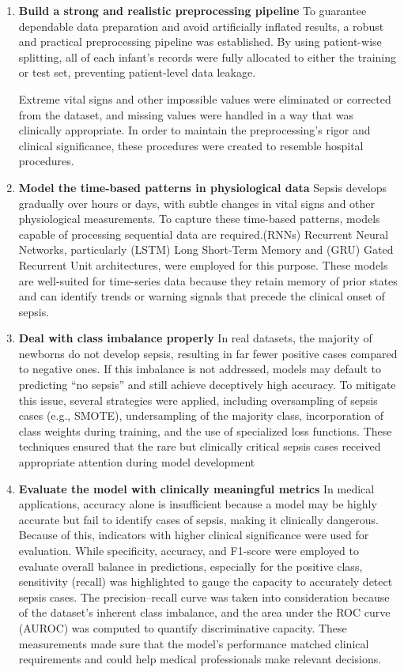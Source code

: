 \documentclass[conference]{IEEEtran}
\begin{document}
\begin{enumerate}
  \item \textbf{Build a strong and realistic preprocessing pipeline} To guarantee dependable data preparation and avoid artificially inflated results, a robust and practical preprocessing pipeline was established. By using patient-wise splitting, all of each infant's records were fully allocated to either the training or test set, preventing patient-level data leakage.

Extreme vital signs and other impossible values were eliminated or corrected from the dataset, and missing values were handled in a way that was clinically appropriate. In order to maintain the preprocessing's rigor and clinical significance, these procedures were created to resemble hospital procedures.

    \item \textbf{Model the time-based patterns in physiological data }Sepsis develops gradually over hours or days, with subtle changes in vital signs and other physiological measurements. To capture these time-based patterns, models capable of processing sequential data are required.(RNNs) Recurrent Neural Networks, particularly (LSTM) Long Short-Term Memory and  (GRU) Gated Recurrent Unit architectures, were employed for this purpose. These models are well-suited for time-series data because they retain memory of prior states and can identify trends or warning signals that precede the clinical onset of sepsis.
    \item \textbf{Deal with class imbalance properly  } In real datasets, the majority of newborns do not develop sepsis, resulting in far fewer positive cases compared to negative ones. If this imbalance is not addressed, models may default to predicting “no sepsis” and still achieve deceptively high accuracy. To mitigate this issue, several strategies were applied, including oversampling of sepsis cases (e.g., SMOTE), undersampling of the majority class, incorporation of class weights during training, and the use of specialized loss functions. These techniques ensured that the rare but clinically critical sepsis cases received appropriate attention during model development
      \item \textbf{Evaluate the model with clinically meaningful metrics  }In medical applications, accuracy alone is insufficient because a model may be highly accurate but fail to identify cases of sepsis, making it clinically dangerous. Because of this, indicators with higher clinical significance were used for evaluation. While specificity, accuracy, and F1-score were employed to evaluate overall balance in predictions, especially for the positive class, sensitivity (recall) was highlighted to gauge the capacity to accurately detect sepsis cases. The precision–recall curve was taken into consideration because of the dataset's inherent class imbalance, and the area under the ROC curve (AUROC) was computed to quantify discriminative capacity. These measurements made sure that the model's performance matched clinical requirements and could help medical professionals make relevant decisions.
      

\end{enumerate}
\end{document}
